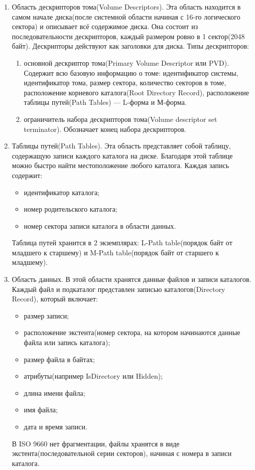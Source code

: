 \begin{enumerate}
\item Область дескрипторов тома(Volume Descriptors). Эта область находится в самом начале диска(после системной области начиная с 16-го логического сектора) и описывает всё содержимое диска. Она состоит из последовательности дескрипторов, каждый размером ровно в 1 сектор(2048 байт). Дескрипторы действуют как заголовки для диска. Типы дескрипторов:
\begin{enumerate}
\item основной дескриптор тома(Primary Volume Descriptor или PVD). Содержит всю базовую информацию о томе: идентификатор системы, идентификатор тома, размер сектора, количество секторов в томе, расположение корневого каталога(Root Directory Record), расположение таблицы путей(Path Tables) — L-форма и М-форма.
\item ограничитель набора дескрипторов тома(Volume descriptor set terminator). Обозначает конец набора дескрипторов.
\end{enumerate}
\item Таблицы путей(Path Tables). Эта область представляет собой таблицу, содержащую записи каждого каталога на диске. Благодаря этой таблице можно быстро найти местоположение любого каталога. Каждая запись содержит:
\begin{itemize}
\item идентификатор каталога;
\item номер родительского каталога;
\item номер сектора записи каталога в области данных.
\end{itemize}
Таблица путей хранится в 2 экземплярах: L-Path table(порядок байт от младшего к старшему) и M-Path table(порядок байт от старшего к младшему).
\item Область данных. В этой области хранятся данные файлов и записи каталогов.
Каждый файл и подкаталог представлен записью каталогов(Directory Record), который включает:
\begin{itemize}
\item размер записи;
\item расположение экстента(номер сектора, на котором начинаются данные файла или запись каталога);
\item размер файла в байтах;
\item атрибуты(например IsDirectory или Hidden);
\item длина имени файла;
\item имя файла;
\item дата и время записи.
\end{itemize}
В ISO 9660 нет фрагментации, файлы хранятся в виде экстента(последовательной серии секторов), начиная с номера в записи каталога.
\end{enumerate}


